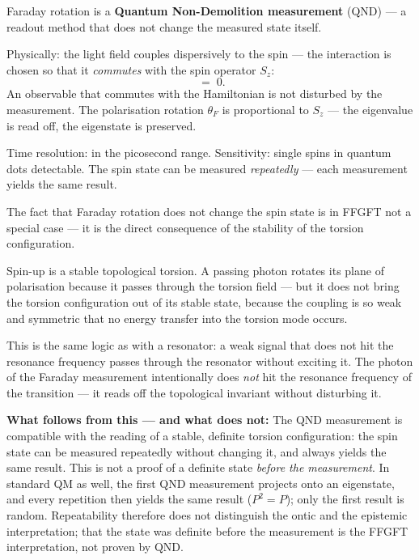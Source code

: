 \begin{keyresult}
Faraday rotation is a
\textbf{Quantum Non-Demolition measurement} (QND) ---
a readout method that does not change the measured state itself.

Physically: the light field couples dispersively to the spin ---
the interaction is chosen so that it \emph{commutes}
with the spin operator $S_z$:
\begin{equation}
  [H_\text{Faraday},\; S_z] \;=\; 0.
\end{equation}
An observable that commutes with the Hamiltonian
is not disturbed by the measurement.
The polarisation rotation $\theta_F$ is proportional to $S_z$
--- the eigenvalue is read off, the eigenstate is preserved.

Time resolution: in the picosecond range.
Sensitivity: single spins in quantum dots detectable.
The spin state can be measured \emph{repeatedly} ---
each measurement yields the same result.
\end{keyresult}

\begin{foundation}
The fact that Faraday rotation does not change the spin state
is in FFGFT not a special case ---
it is the direct consequence of the stability of the torsion configuration.

Spin-up is a stable topological torsion.
A passing photon rotates its plane of polarisation
because it passes through the torsion field --- but it does not
bring the torsion configuration out of its stable state,
because the coupling is so weak and symmetric
that no energy transfer into the torsion mode occurs.

This is the same logic as with a resonator:
a weak signal that does not hit the resonance frequency
passes through the resonator without exciting it.
The photon of the Faraday measurement intentionally
does \emph{not} hit the resonance frequency of the transition ---
it reads off the topological invariant without disturbing it.

\textbf{What follows from this --- and what does not:}
The QND measurement is compatible with the reading of a stable,
definite torsion configuration: the spin state can be measured
repeatedly without changing it, and always yields the same result.
This is not a proof of a definite state \emph{before the measurement}.
In standard QM as well, the first QND measurement projects onto an
eigenstate, and every repetition then yields the same result
($P^2 = P$); only the first result is random. Repeatability therefore
does not distinguish the ontic and the epistemic interpretation; that
the state was definite before the measurement is the FFGFT
interpretation, not proven by QND.
\end{foundation}

